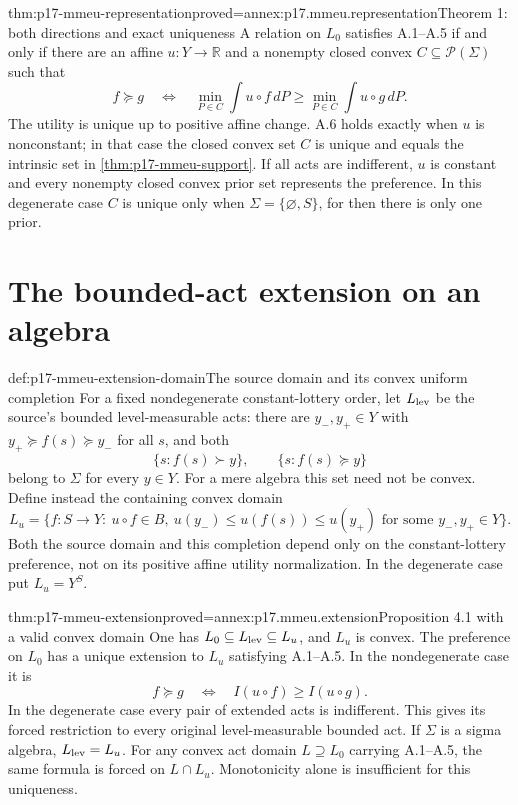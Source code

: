 \begin{hbtheorem}{thm:p17-mmeu-representation}{proved=annex:p17.mmeu.representation}{Theorem 1: both directions and exact uniqueness}
A relation on \(L_0\) satisfies A.1--A.5 if and only if
there are an affine \(u:Y\to\mathbb R\) and a nonempty
closed convex \(C\subseteq\mathcal P(\Sigma)\) such that
\[
 f\succeq g\quad\Longleftrightarrow\quad
       \min_{P\in C}\int u\circ f\,dP
                    \geq\min_{P\in C}\int u\circ g\,dP .
\]
The utility is unique up to positive affine change.
A.6 holds exactly when \(u\) is nonconstant; in that case
the closed convex set \(C\) is unique and equals the
intrinsic set in \cref{thm:p17-mmeu-support}.
If all acts are indifferent, \(u\) is constant and every
nonempty closed convex prior set represents the preference.
In this degenerate case \(C\) is unique only when
\(\Sigma=\{\varnothing,S\}\), for then there is only one prior.
\end{hbtheorem}

\section{The bounded-act extension on an algebra}

\begin{hbdefinition}{def:p17-mmeu-extension-domain}{The source domain and its convex uniform completion}
For a fixed nondegenerate constant-lottery order, let
\(L_{\rm lev}\) be the source's bounded level-measurable acts:
there are \(y_-,y_+\in Y\) with
\(y_+\succeq f(s)\succeq y_-\) for all \(s\), and both
\[
              \{s:f(s)\succ y\},\qquad\{s:f(s)\succeq y\}
\]
belong to \(\Sigma\) for every \(y\in Y\).
For a mere algebra this set need not be convex.
Define instead the containing convex domain
\[
 L_u=\{f:S\to Y:\ u\circ f\in B,\
               u(y_-)\leq u(f(s))\leq u(y_+)
                   \text{ for some }y_-,y_+\in Y\}.
\]
Both the source domain and this completion depend only on
the constant-lottery preference, not on its positive affine
utility normalization. In the degenerate case put \(L_u=Y^S\).
\end{hbdefinition}

\begin{hbtheorem}{thm:p17-mmeu-extension}{proved=annex:p17.mmeu.extension}{Proposition 4.1 with a valid convex domain}
One has \(L_0\subseteq L_{\rm lev}\subseteq L_u\), and
\(L_u\) is convex. The preference on \(L_0\) has a unique
extension to \(L_u\) satisfying A.1--A.5. In the
nondegenerate case it is
\[
                            f\succeq g\quad\Longleftrightarrow\quad
                                      I(u\circ f)\geq I(u\circ g).
\]
In the degenerate case every pair of extended acts is indifferent.
This gives its forced restriction to every original
level-measurable bounded act.
If \(\Sigma\) is a sigma algebra, \(L_{\rm lev}=L_u\).
For any convex act domain \(L\supseteq L_0\) carrying
A.1--A.5, the same formula is forced on \(L\cap L_u\).
Monotonicity alone is insufficient for this uniqueness.
\end{hbtheorem}

